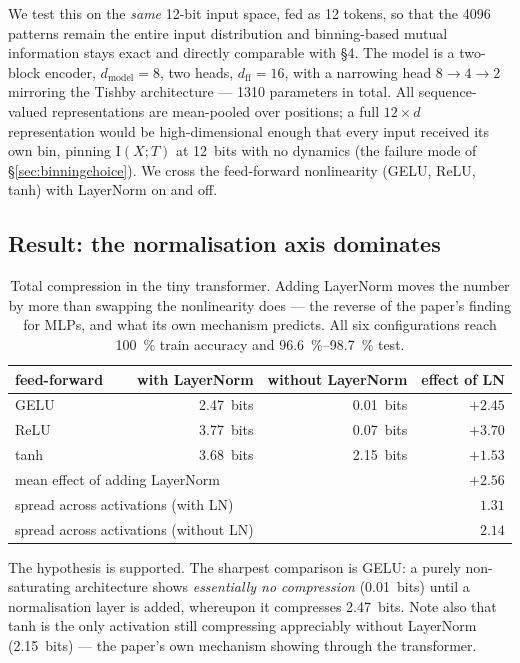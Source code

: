 \documentclass[11pt,a4paper]{article}
\newcommand{\I}{\mathrm{I}}
\begin{document}
We test this on the \emph{same} 12-bit input space, fed as 12 tokens, so that the
4096 patterns remain the entire input distribution and binning-based mutual
information stays exact and directly comparable with \S4. The model is a
two-block encoder, $d_{\text{model}}=8$, two heads, $d_{\text{ff}}=16$, with a
narrowing head $8\to4\to2$ mirroring the Tishby architecture --- \num{1310}
parameters in total. All sequence-valued representations are mean-pooled over
positions; a full $12\times d$ representation would be high-dimensional enough
that every input received its own bin, pinning $\I(X;T)$ at \SI{12}{bits} with no
dynamics (the failure mode of \S\ref{sec:binningchoice}). We cross the
feed-forward nonlinearity (GELU, ReLU, tanh) with LayerNorm on and off.

\subsection{Result: the normalisation axis dominates}
\label{sec:results-transformer}

\begin{table}[h]
\centering
\small
\begin{tabular}{lrrr}
\toprule
\textbf{feed-forward} & \textbf{with LayerNorm} & \textbf{without LayerNorm}
                      & \textbf{effect of LN} \\
\midrule
GELU & \SI{2.47}{bits} & \SI{0.01}{bits} & $+2.45$ \\
ReLU & \SI{3.77}{bits} & \SI{0.07}{bits} & $+3.70$ \\
tanh & \SI{3.68}{bits} & \SI{2.15}{bits} & $+1.53$ \\
\midrule
\multicolumn{2}{l}{mean effect of adding LayerNorm} & & $\mathbf{+2.56}$ \\
\multicolumn{2}{l}{spread across activations (with LN)} & & $1.31$ \\
\multicolumn{2}{l}{spread across activations (without LN)} & & $2.14$ \\
\bottomrule
\end{tabular}
\caption{Total compression in the tiny transformer. Adding LayerNorm moves the
number by more than swapping the nonlinearity does --- the reverse of the paper's
finding for MLPs, and what its own mechanism predicts. All six configurations
reach \SI{100}{\percent} train accuracy and \SIrange{96.6}{98.7}{\percent} test.}
\label{tab:transformer}
\end{table}

The hypothesis is supported. The sharpest comparison is GELU: a purely
non-saturating architecture shows \emph{essentially no compression}
(\SI{0.01}{bits}) until a normalisation layer is added, whereupon it compresses
\SI{2.47}{bits}. Note also that tanh is the only activation still compressing
appreciably without LayerNorm (\SI{2.15}{bits}) --- the paper's own mechanism
showing through the transformer.
\end{document}

